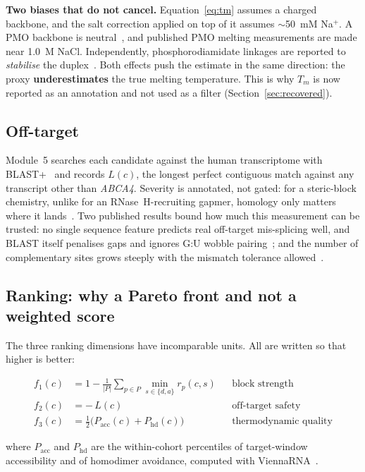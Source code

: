 \documentclass[11pt,a4paper]{article}
\begin{document}
\textbf{Two biases that do not cancel.} Equation~\ref{eq:tm} assumes a charged backbone, and the
salt correction applied on top of it assumes $\sim$50~mM Na$^+$. A PMO backbone is
neutral~\cite{summerton1997}, and published PMO melting measurements are made near 1.0~M NaCl.
Independently, phosphorodiamidate linkages are reported to \emph{stabilise} the
duplex~\cite{maksudov2023}. Both effects push the estimate in the same direction: the proxy
\textbf{underestimates} the true melting temperature. This is why $T_m$ is now reported as an
annotation and not used as a filter (Section~\ref{sec:recovered}).

\subsection{Off-target}

Module~5 searches each candidate against the human transcriptome with BLAST+~\cite{camacho2009} and
records $L(c)$, the longest perfect contiguous match against any transcript other than
\emph{ABCA4}. Severity is annotated, not gated: for a steric-block chemistry, unlike for an
RNase~H-recruiting gapmer, homology only matters where it lands~\cite{dhuri2020}. Two published
results bound how much this measurement can be trusted: no single sequence feature predicts real
off-target mis-splicing well, and BLAST itself penalises gaps and ignores G:U wobble
pairing~\cite{scharner2020}; and the number of complementary sites grows steeply with the mismatch
tolerance allowed~\cite{yoshida2018}.

\subsection{Ranking: why a Pareto front and not a weighted score}
\label{sec:pareto}

The three ranking dimensions have incomparable units. All are written so that higher is better:

\begin{align}
f_1(c) &= 1 - \frac{1}{|P|}\sum_{p \in P} \min_{s \in \{d,a\}} r_p(c,s)
        && \text{block strength} \label{eq:f1}\\[0.2em]
f_2(c) &= -\,L(c)
        && \text{off-target safety} \label{eq:f2}\\[0.2em]
f_3(c) &= \tfrac{1}{2}\bigl(P_{\mathrm{acc}}(c) + P_{\mathrm{hd}}(c)\bigr)
        && \text{thermodynamic quality} \label{eq:f3}
\end{align}

where $P_{\mathrm{acc}}$ and $P_{\mathrm{hd}}$ are the within-cohort percentiles of target-window
accessibility and of homodimer avoidance, computed with ViennaRNA~\cite{lorenz2011}.
\end{document}
